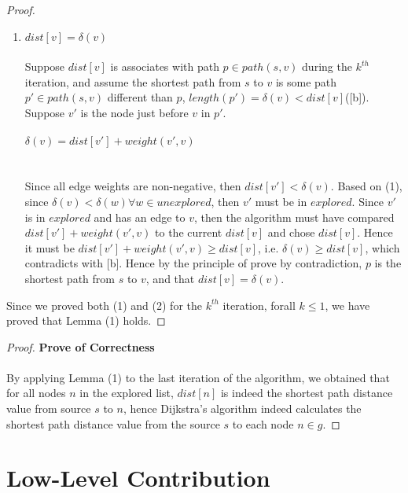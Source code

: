 \documentclass[11pt, a4paper]{article} %
\theoremstyle{definition}
\newcommand\ftab[1][5cm]{\hspace*{#1}}
\begin{document}
\begin{proof}
\begin{enumerate}
(Proof below are not modified yet)
\item $dist[v] = \delta(v)$
\\\\
Suppose $dist[v]$ is associates with path $p \in path(s, v)$ during the $k^{th}$ iteration, and assume the shortest path from $s$ to $v$ is some path $p' \in path(s, v)$ different than $p$, $length(p') = \delta(v) < dist[v]$([b]). Suppose $v'$ is the node just before $v$ in $p'$. 
\\\\
\ftab $\delta(v) = dist[v'] + weight(v', v)$ \\
\\\\
Since all edge weights are non-negative, then $dist[v'] < \delta(v)$. Based on (1), since $\delta(v) < \delta(w) \forall w \in unexplored$, then $v'$ must be in $explored$. Since $v'$ is in $explored$ and has an edge to $v$, then the algorithm must have compared $dist[v'] + weight(v', v)$ to the current $dist[v]$ and chose $dist[v]$. Hence it must be $dist[v'] + weight(v', v) \geq dist[v]$, i.e. $\delta(v) \geq dist[v]$, which contradicts with [b]. Hence by the principle of prove by contradiction, $p$ is the shortest path from $s$ to $v$, and that $dist[v] = \delta(v)$. 
\end{enumerate}
Since we proved both (1) and (2) for the $k^{th}$ iteration, forall $k \leq 1$, we have proved that Lemma (1) holds.
\end{proof}

\begin{proof}\textbf{Prove of Correctness}
\\\\
By applying Lemma (1) to the last iteration of the algorithm, we obtained that for all nodes $n$ in the explored list, $dist[n]$ is indeed the shortest path distance value from source $s$ to $n$, hence Dijkstra's algorithm indeed calculates the shortest path distance value from the source $s$ to each node $n \in g$. 
\end{proof}


\section{Low-Level Contribution}
\end{document}
